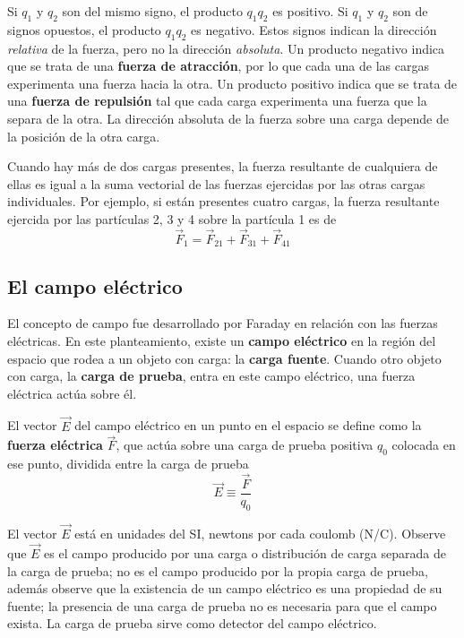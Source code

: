     \PN Si $q_{1}$ y $q_{2}$ son del mismo signo, el producto $q_{1} q_{2}$ es positivo. Si $q_{1}$ y $ q_{2}$ son de
    signos opuestos, el producto $q_{1} q_{2}$ es negativo. Estos signos indican la dirección \textit{relativa} de la
    fuerza, pero no la dirección \textit{absoluta}. Un producto negativo indica que se trata de una \textbf{fuerza de
    atracción}, por lo que cada una de las cargas experimenta una fuerza hacia la otra. Un producto positivo indica que
    se trata de una \textbf{fuerza de repulsión} tal que cada carga experimenta una fuerza que la separa de la otra. La
    dirección absoluta de la fuerza sobre una carga depende de la posición de la otra carga.

    \VS
    \PN Cuando hay más de dos cargas presentes, la fuerza resultante de cualquiera de ellas es igual a la suma vectorial
    de las fuerzas ejercidas por las otras cargas individuales. Por ejemplo, si están presentes cuatro cargas, la fuerza
    resultante ejercida por las partículas 2, 3 y 4 sobre la partícula 1 es de
    \begin{equation*}
      \vec{F}_{1} = \vec{F}_{21} + \vec{F}_{31} + \vec{F}_{41}
    \end{equation*}

  \subsection{El campo eléctrico}
    \PN El concepto de campo fue desarrollado por Faraday en relación con las fuerzas eléctricas. En este planteamiento,
    existe un \textbf{campo eléctrico} en la región del espacio que rodea a un objeto con carga: la \textbf{carga
    fuente}. Cuando otro objeto con carga, la \textbf{carga de prueba}, entra en este campo eléctrico, una fuerza
    eléctrica actúa sobre él.

    \VS
    \PN El vector $\vec{E}$ del campo eléctrico en un punto en el espacio se define como la \textbf{fuerza eléctrica}
    $\vec{F}$, que actúa sobre una carga de prueba positiva $q_{0}$ colocada en ese punto, dividida entre la carga de
    prueba
    \begin{equation*}
      \vec{E} \equiv \frac{\vec{F}}{q_{0}}
    \end{equation*}

    \PN El vector $\vec{E}$ está en unidades del SI, newtons por cada coulomb (N/C). Observe que $\vec{E}$ es el campo
    producido por una carga o distribución de carga separada de la carga de prueba; no es el campo producido por la
    propia carga de prueba, además observe que la existencia de un campo eléctrico es una propiedad de su fuente; la
    presencia de una carga de prueba no es necesaria para que el campo exista. La carga de prueba sirve como detector
    del campo eléctrico.

